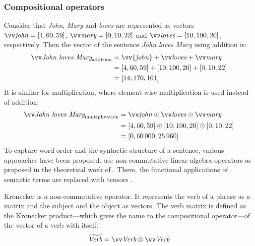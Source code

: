 \subsubsection{Compositional operators}

Consider that \textit{John}, \textit{Mary} and \textit{loves} are represented as vectors $\ov{\text{\it john}} = [4, 60, 59]$, $\ov{\text{\it mary}} = [0, 10, 22]$ and $\ov{\text{\it loves}} = [10, 100, 20]$, respectively. Then the vector of the sentence \textit{John loves Mary} using addition is:
%
\begin{align*}
  \ov{\text{\it John loves Mary}}_{\text{addition}} &= \vv{\mathit{john}} + \ov{\mathit{loves}} + \ov{\mathit{mary}} \\
                                  &= [4, 60, 59] + [10, 100, 20] + [0, 10, 22] \\
                                  &= [14, 170, 101]
\end{align*}
%
It is similar for multiplication, where element-wise multiplication is used instead of addition:
%
\begin{align*}
  \ov{\text{\it John loves Mary}}_{\text{multiplication}} &= \ov{\mathit{john}} \odot \ov{\mathit{loves}} \odot \ov{\mathit{mary}} \\
                                  &= [4, 60, 59] \odot [10, 100, 20] \odot [0, 10, 22] \\
                                  &= [0, 60\,000, 25\,960]
\end{align*}
%
To capture word order and the syntactic structure of a sentence, various approaches have been proposed.  use non-commutative linear algebra operators as proposed in the theoretical work of . There, the functional applications of semantic terms are replaced with tensors \cite{Bourbaki1998commutative}.

Kronecker \cite{Grefenstette:2011:ETV:2140490.2140497} is a non-commutative operator. It represents the verb of a phrase as a matrix and the subject and the object as vectors. The verb matrix is defined as the Kronecker product---which gives the name to the compositional operator---of the vector of a verb with itself:
%
\begin{equation}
  \widetilde{\mathit{Verb}} = \ov{\mathit{Verb}} \otimes \ov{\mathit{Verb}}
\end{equation}

